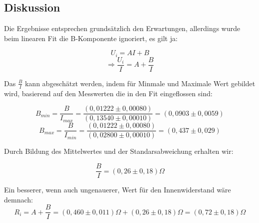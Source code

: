 \documentclass{article}
\begin{document}
\subsection{Diskussion}

Die Ergebnisse entsprechen grundsätzlich den Erwartungen, allerdings wurde beim linearen
Fit die B-Komponente ignoriert, es gilt ja:

$$U_i=AI+B$$
$$\Rightarrow \frac{U_i}{I}=A+\frac{B}{I}$$

Das $\frac{B}{I}$ kann abgeschätzt werden, indem für Minmale und Maximale
Wert gebildet wird, basierend auf den Messwerten die in den Fit eingeflossen sind:

$$B_{min}=\frac{B}{I_{max}}=\frac{(0,01222 \pm 0,00080)}{(0,13540 \pm 0,00010)}=(0,0903 \pm 0,0059)$$
$$B_{max}=\frac{B}{I_{min}}=\frac{(0,01222 \pm 0,00080)}{(0,02800 \pm 0,00010)}=(0,437 \pm 0,029)$$

Durch Bildung des Mittelwertes und der Standarsabweichung erhalten wir:

$$\frac{B}{I}=(0,26 \pm 0,18) \Omega$$

Ein besserer, wenn auch ungenauerer, Wert für den Innenwiderstand wäre demnach:
$$R_i=A+\frac{B}{I}=(0,460 \pm 0,011)\Omega+(0,26 \pm 0,18)\Omega=(0,72 \pm 0,18)\Omega$$


\end{document}
